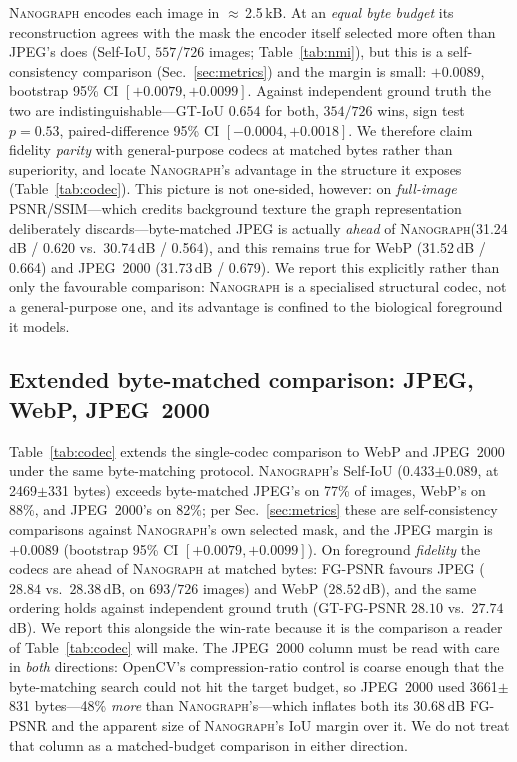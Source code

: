 \documentclass[10pt,a4paper]{article}
\newcommand{\method}{\textnormal{\textsc{Nanograph}}\xspace}
\begin{document}
\method encodes each image in $\approx$\,2.5\,kB. At an \emph{equal byte
budget} its reconstruction agrees with the mask the encoder itself selected
more often than JPEG's does (Self-IoU, $557/726$ images;
Table~\ref{tab:nmi}), but this is a self-consistency comparison
(Sec.~\ref{sec:metrics}) and the margin is small: $+0.0089$, bootstrap 95\%
CI $[+0.0079,+0.0099]$. Against independent ground truth the two are
indistinguishable---GT-IoU $0.654$ for both, $354/726$ wins, sign test
$p=0.53$, paired-difference 95\% CI $[-0.0004,+0.0018]$. We therefore claim
fidelity \emph{parity} with general-purpose codecs at matched bytes rather
than superiority, and locate \method's advantage in the structure it exposes
(Table~\ref{tab:codec}). This picture is not
one-sided, however: on \emph{full-image} PSNR/SSIM---which credits background
texture the graph representation deliberately discards---byte-matched JPEG
is actually \emph{ahead} of \method (31.24\,dB / 0.620 vs.\ 30.74\,dB /
0.564), and this remains true for WebP (31.52\,dB / 0.664) and JPEG~2000
(31.73\,dB / 0.679). We report this explicitly rather than only the
favourable comparison: \method is a specialised structural codec, not a
general-purpose one, and its advantage is confined to the biological
foreground it models.

\subsection{Extended byte-matched comparison: JPEG, WebP, JPEG~2000}
Table~\ref{tab:codec} extends the single-codec comparison to WebP and
JPEG~2000 under the same byte-matching protocol. \method's Self-IoU
(0.433$\pm$0.089, at 2469$\pm$331 bytes) exceeds byte-matched JPEG's on 77\%
of images, WebP's on 88\%, and JPEG~2000's on 82\%; per
Sec.~\ref{sec:metrics} these are self-consistency comparisons against
\method's own selected mask, and the JPEG margin is $+0.0089$ (bootstrap 95\%
CI $[+0.0079,+0.0099]$). On foreground \emph{fidelity} the codecs are ahead
of \method at matched bytes: FG-PSNR favours JPEG ($28.84$ vs.\ $28.38$\,dB,
on $693/726$ images) and WebP ($28.52$\,dB), and the same ordering holds
against independent ground truth (GT-FG-PSNR $28.10$ vs.\ $27.74$\,dB). We
report this alongside the win-rate because it is the comparison a reader of
Table~\ref{tab:codec} will make. The JPEG~2000 column must be read with care
in \emph{both} directions: OpenCV's compression-ratio control is coarse
enough that the byte-matching search could not hit the target budget, so
JPEG~2000 used 3661$\pm$831 bytes---48\% \emph{more} than \method's---which
inflates both its $30.68$\,dB FG-PSNR and the apparent size of \method's IoU
margin over it. We do not treat that column as a matched-budget comparison in
either direction.
\end{document}
